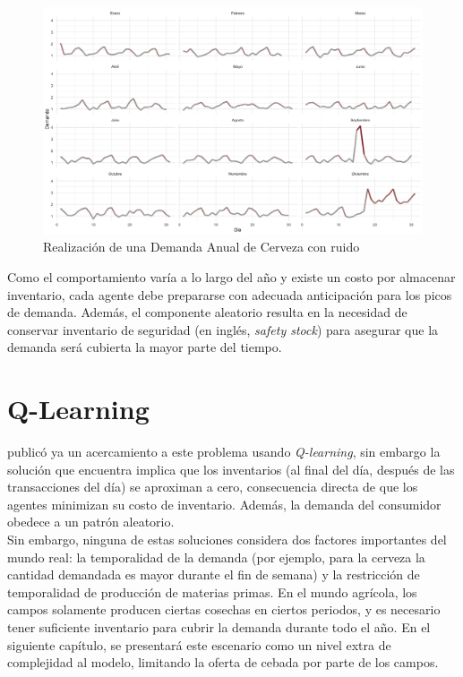 \begin{figure}[ht!]
\caption{Realizaci\'on de una Demanda Anual de Cerveza con ruido }
\label{yearly_base_noisy}
\includegraphics[width=13cm]{tesis_tex/figs/monthly_demand_with_noise_ggplot.png}
\centering
\end{figure}

Como el comportamiento var\'ia a lo largo del a\~no y existe un costo por almacenar inventario, cada agente debe prepararse con adecuada anticipaci\'on para los picos de demanda. Adem\'as, el componente aleatorio resulta en la necesidad de conservar inventario de seguridad (en ingl\'es, \textit{safety stock}) para asegurar que la demanda ser\'a cubierta la mayor parte del tiempo.

\section{Q-Learning}

\citet{Chaharsooghi} public\'o ya un acercamiento a este problema usando \textit{Q-learning}, sin embargo la soluci\'on que encuentra implica que los inventarios (al final del d\'ia, despu\'es de las transacciones del d\'ia) se aproximan a cero, consecuencia directa de que los agentes minimizan su costo de inventario. Adem\'as, la demanda del consumidor obedece a un patr\'on aleatorio.\\

Sin embargo, ninguna de estas soluciones considera dos factores importantes del mundo real: la temporalidad de la demanda (por ejemplo, para la cerveza la cantidad demandada es mayor durante el fin de semana) y la restricción de temporalidad de producci\'on de materias primas. En el mundo agr\'icola, los campos solamente producen ciertas cosechas en ciertos periodos, y es necesario tener suficiente inventario para cubrir la demanda durante todo el a\~no. En el siguiente cap\'itulo, se presentar\'a este escenario como un nivel extra de complejidad al modelo, limitando la oferta de cebada por parte de los campos.